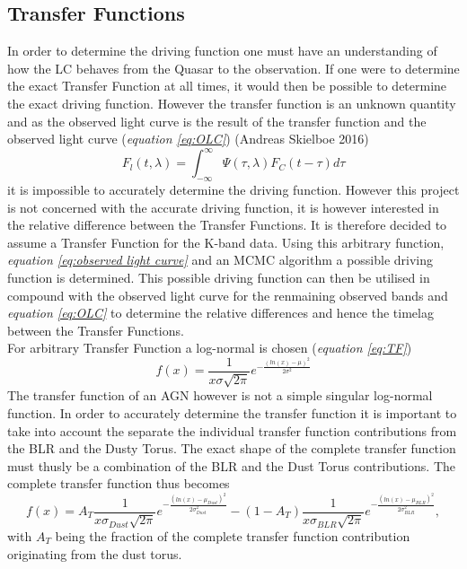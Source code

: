 \documentclass[a4paper, 12pt, twoside]{article}
\begin{document}
\subsection{Transfer Functions}
In order to determine the driving function one must have an understanding of how the LC behaves from the Quasar to the observation. If one were to determine the exact Transfer Function at all times, it would then be possible to determine the exact driving function. However the transfer function is an unknown quantity and as the observed light curve is the result of the transfer function and the observed light curve (\emph{equation \ref{eq:OLC}}) (Andreas Skielboe 2016)
\begin{equation}
F_l(t,\lambda) = \int_{-\infty}^{\infty}\Psi(\tau,\lambda)F_C(t-\tau)d\tau
\label{eq:OLC}
\end{equation}
it is impossible to accurately determine the driving function. However this project is not concerned with the accurate driving function, it is however interested in the relative difference between the Transfer Functions. It is therefore decided to assume a Transfer Function for the K-band data. Using this arbitrary function, \emph{equation \ref{eq:observed light curve}} and an MCMC algorithm a possible driving function is determined. This possible driving function can then be utilised in compound with the observed light curve for the renmaining observed bands and \emph{equation \ref{eq:OLC}} to determine the relative differences and hence the timelag between the Transfer Functions. \\
For arbitrary Transfer Function a log-normal is chosen (\emph{equation \ref{eq:TF}})
\begin{equation}
f(x) = \frac{1}{x\sigma\sqrt{2\pi}}e^{-\frac{(ln(x)-\mu)^2}{2\sigma^2}}
\label{eq:TF}
\end{equation}
The transfer function of an AGN however is not a simple singular log-normal function. In order to accurately determine the transfer function it is important to take into account the separate the individual transfer function contributions from the BLR and the Dusty Torus. The exact shape of the complete transfer function must thusly be a combination of the BLR and the Dust Torus contributions. The complete transfer function thus becomes
\begin{equation}
f(x) = A_{T}\frac{1}{x\sigma_{Dust}\sqrt{2\pi}}e^{-\frac{(ln(x)-\mu_{Dust})^2}{2\sigma_{Dust}^2}} - (1 - A_{T})\frac{1}{x\sigma_{BLR}\sqrt{2\pi}}e^{-\frac{(ln(x)-\mu_{BLR})^2}{2\sigma_{BLR}^2}},
\label{eq:TF_full}
\end{equation}
with $A_{T}$ being the fraction of the complete transfer function contribution originating from the dust torus. 
\end{document}
